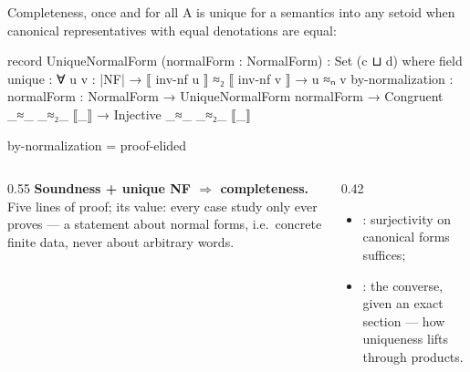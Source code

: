 \begin{frame}{Completeness, once and for all \InPaper}
A  is \alert{unique} for a semantics  into any setoid
when canonical representatives with equal denotations are equal:
\begin{code}
record UniqueNormalForm (normalForm : NormalForm) : Set (c ⊔ d) where
  field unique : ∀ {u v : |NF|} → ⟦ inv-nf u ⟧ ≈₂ ⟦ inv-nf v ⟧ → u ≈ₙ v
by-normalization : {normalForm : NormalForm} → UniqueNormalForm normalForm →
  Congruent _≈_ _≈₂_ ⟦_⟧ → Injective _≈_ _≈₂_ ⟦_⟧
\end{code}
\begin{code}[hide]
by-normalization = proof-elided
\end{code}
\begin{columns}[c]
\begin{column}{0.55\textwidth}
\small
\textbf{Soundness + unique NF $\Rightarrow$ completeness.} Five lines of proof;
its value: every case study only ever proves  --- a statement about
\alert{normal forms}, i.e.\ concrete finite data, never about arbitrary words.
\end{column}
\begin{column}{0.42\textwidth}
\small
\begin{itemize}
  \item {}: surjectivity on canonical forms suffices;
  \item {}: the converse, given an exact section --- how
        uniqueness lifts through products.
\end{itemize}
\end{column}
\end{columns}
\end{frame}


